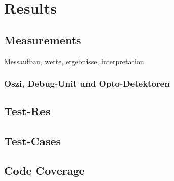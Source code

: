 \documentclass[master,english,smartquotes,apa]{hgbthesis}
\begin{document}
			\subsection{}

	
	\chapter{Results}
	\label{cha:Results}
	\section{Measurements}
		Messaufbau, werte, ergebnisse, interpretation
		\subsection{Oszi, Debug-Unit und Opto-Detektoren}
		\section{Test-Res}
		\section{Test-Cases}
		\section{Code Coverage}
\end{document}
